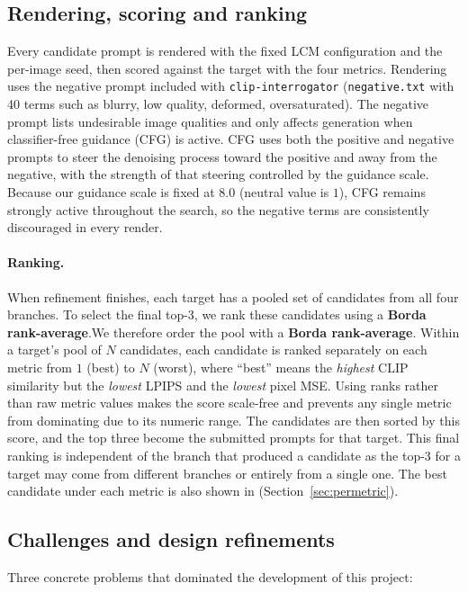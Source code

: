 \documentclass[runningheads]{llncs}
\begin{document}
\subsection{Rendering, scoring and ranking}
Every candidate prompt is rendered with the fixed LCM configuration and the per-image seed, then scored against the target with the four metrics. Rendering uses the negative prompt included with \texttt{clip-interrogator} (\texttt{negative.txt} with 40 terms such as blurry, low quality, deformed, oversaturated). The negative prompt lists undesirable image qualities and only affects generation when classifier-free guidance (CFG) is active. CFG uses both the positive and negative prompts to steer the denoising process toward the positive and away from the negative, with the strength of that steering controlled by the guidance scale. Because our guidance scale is fixed at $8.0$ (neutral value is $1$), CFG remains strongly active throughout the search, so the negative terms are consistently discouraged in every render.
 
\paragraph{\normalfont\textbf{Ranking.}}

When refinement finishes, each target has a pooled set of candidates from all four branches. To select the final top-3, we rank these candidates using a \textbf{Borda rank-average}.We therefore order the pool with a \textbf{Borda rank-average}. Within a target's pool of $N$ candidates, each candidate is ranked separately on each metric from $1$ (best) to $N$ (worst), where ``best'' means the \emph{highest} CLIP similarity but the \emph{lowest} LPIPS and the \emph{lowest} pixel MSE. Using ranks rather than raw metric values makes the score scale-free and prevents any single metric from dominating due to its numeric range. The candidates are then sorted by this score, and the top three become the submitted prompts for that target. This final ranking is independent of the branch that produced a candidate as the top-3 for a target may come from different branches or entirely from a single one. The best candidate under each metric is also shown in (Section~\ref{sec:permetric}).

\subsection{Challenges and design refinements}
\label{sec:failures}
Three concrete problems that dominated the development of this project:
\end{document}
